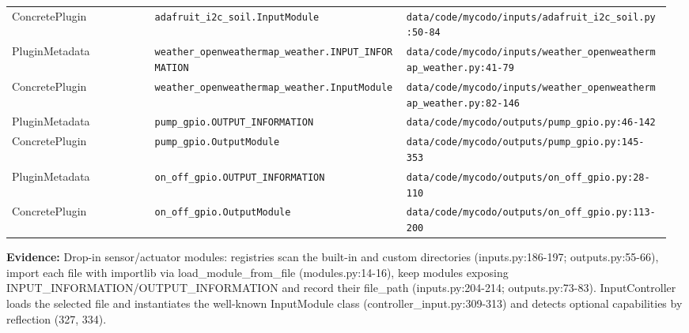 \documentclass[11pt,a4paper]{article}
\newcommand{\field}[2]{\textbf{#1:} #2\par}
\begin{document}
{\begin{longtable}{@{}P{0.21\linewidth}P{0.37\linewidth}P{0.39\linewidth}@{}}
ConcretePlugin & \texttt{adafruit\_\allowbreak{}i2c\_\allowbreak{}soil.\allowbreak{}InputModule} & \texttt{data/\allowbreak{}code/\allowbreak{}mycodo/\allowbreak{}inputs/\allowbreak{}adafruit\_\allowbreak{}i2c\_\allowbreak{}soil.\allowbreak{}py:50-84} \\
PluginMetadata & \texttt{weather\_\allowbreak{}openweathermap\_\allowbreak{}weather.\allowbreak{}INPUT\_\allowbreak{}INFORMATION} & \texttt{data/\allowbreak{}code/\allowbreak{}mycodo/\allowbreak{}inputs/\allowbreak{}weather\_\allowbreak{}openweathermap\_\allowbreak{}weather.\allowbreak{}py:41-79} \\
ConcretePlugin & \texttt{weather\_\allowbreak{}openweathermap\_\allowbreak{}weather.\allowbreak{}InputModule} & \texttt{data/\allowbreak{}code/\allowbreak{}mycodo/\allowbreak{}inputs/\allowbreak{}weather\_\allowbreak{}openweathermap\_\allowbreak{}weather.\allowbreak{}py:82-146} \\
PluginMetadata & \texttt{pump\_\allowbreak{}gpio.\allowbreak{}OUTPUT\_\allowbreak{}INFORMATION} & \texttt{data/\allowbreak{}code/\allowbreak{}mycodo/\allowbreak{}outputs/\allowbreak{}pump\_\allowbreak{}gpio.\allowbreak{}py:46-142} \\
ConcretePlugin & \texttt{pump\_\allowbreak{}gpio.\allowbreak{}OutputModule} & \texttt{data/\allowbreak{}code/\allowbreak{}mycodo/\allowbreak{}outputs/\allowbreak{}pump\_\allowbreak{}gpio.\allowbreak{}py:145-353} \\
PluginMetadata & \texttt{on\_\allowbreak{}off\_\allowbreak{}gpio.\allowbreak{}OUTPUT\_\allowbreak{}INFORMATION} & \texttt{data/\allowbreak{}code/\allowbreak{}mycodo/\allowbreak{}outputs/\allowbreak{}on\_\allowbreak{}off\_\allowbreak{}gpio.\allowbreak{}py:28-110} \\
ConcretePlugin & \texttt{on\_\allowbreak{}off\_\allowbreak{}gpio.\allowbreak{}OutputModule} & \texttt{data/\allowbreak{}code/\allowbreak{}mycodo/\allowbreak{}outputs/\allowbreak{}on\_\allowbreak{}off\_\allowbreak{}gpio.\allowbreak{}py:113-200} \\
\bottomrule\end{longtable}}
\field{Evidence}{Drop-in sensor/actuator modules: registries scan the built-in and custom directories (inputs.py:186-197; outputs.py:55-66), import each file with importlib via load\_module\_from\_file (modules.py:14-16), keep modules exposing INPUT\_INFORMATION/OUTPUT\_INFORMATION and record their file\_path (inputs.py:204-214; outputs.py:73-83). InputController loads the selected file and instantiates the well-known InputModule class (controller\_input.py:309-313) and detects optional capabilities by reflection (327, 334).}
\end{document}

